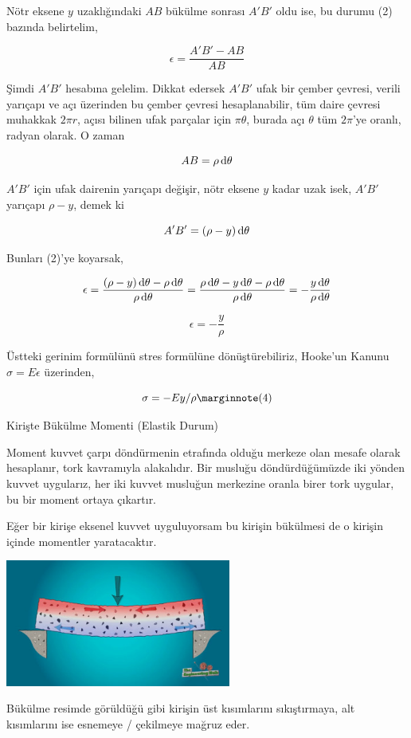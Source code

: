 \documentclass[12pt,fleqn]{article}\usepackage{../../common}
\begin{document}
Nötr eksene $y$ uzaklığındaki $AB$ bükülme sonrası $A'B'$ oldu ise, bu durumu
(2) bazında belirtelim,

$$
\epsilon = \frac{A'B' - AB}{AB}
$$

Şimdi $A'B'$ hesabına gelelim. Dikkat edersek $A'B'$ ufak bir çember çevresi,
verili yarıçapı ve açı üzerinden bu çember çevresi hesaplanabilir, tüm daire
çevresi muhakkak $2 \pi r$, açısı bilinen ufak parçalar için $\pi \theta$,
burada açı $\theta$ tüm $2 \pi$'ye oranlı, radyan olarak. O zaman

$$
AB = \rho \,\mathrm{d} \theta
$$

$A'B'$ için ufak dairenin yarıçapı değişir, nötr eksene $y$ kadar uzak isek,
$A'B'$ yarıçapı $\rho - y$, demek ki 

$$
A'B' = (\rho - y) \,\mathrm{d} \theta
$$

Bunları (2)'ye koyarsak,

$$
\epsilon = \frac{(\rho - y) \,\mathrm{d} \theta - \rho \,\mathrm{d} \theta}{\rho \,\mathrm{d}\theta} =
\frac{\rho \,\mathrm{d}\theta - y \,\mathrm{d}\theta - \rho \,\mathrm{d}\theta}{\rho \,\mathrm{d}\theta} =
- \frac{y \,\mathrm{d}\theta}{\rho \,\mathrm{d}\theta}
$$

$$
\epsilon = - \frac{y}{\rho}
$$

Üstteki gerinim formülünü stres formülüne dönüştürebiliriz, Hooke'un Kanunu
$\sigma = E \epsilon$ üzerinden,

$$
\sigma = -E y / \rho
\mlabel{4}
$$

Kirişte Bükülme Momenti (Elastik Durum)

Moment kuvvet çarpı döndürmenin etrafında olduğu merkeze olan mesafe olarak
hesaplanır, tork kavramıyla alakalıdır. Bir musluğu döndürdüğümüzde iki yönden
kuvvet uygularız, her iki kuvvet musluğun merkezine oranla birer tork uygular,
bu bir moment ortaya çıkartır.

Eğer bir kirişe eksenel kuvvet uyguluyorsam bu kirişin bükülmesi de o kirişin
içinde momentler yaratacaktır.

\includegraphics[width=20em]{phy_020_strs_01_06.jpg}

Bükülme resimde görüldüğü gibi kirişin üst kısımlarını sıkıştırmaya, alt
kısımlarını ise esnemeye / çekilmeye mağruz eder. 
\end{document}
